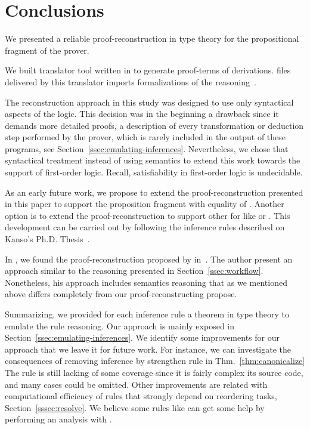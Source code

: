 \documentclass[../main.tex]{subfiles}
\begin{document}

\section{Conclusions}
\label{sec:conclusions}

We presented a reliable proof-reconstruction in type theory
for the propositional fragment of the \Metis prover.

We built \Athena translator tool written in \Haskell
to generate \Agda proof-terms of \Metis derivations.
\Agda files delivered by this translator imports
\Agda formalizations of the \Metis reasoning~\cite{AgdaProp,AgdaMetis}.

The reconstruction approach in this study was designed to use
only syntactical aspects of the logic.
This decision was in the beginning a drawback
since it demands more detailed proofs, a
description of every transformation or deduction step performed by
the prover, which is rarely included in the output of these programs,
see Section~\ref{ssec:emulating-inferences}.
Nevertheless, we chose that syntactical treatment instead of using
semantics to extend this work towards the support of first-order logic.
Recall, satisfiability in first-order logic is undecidable.

As an early future work, we propose to extend the
proof-reconstruction presented in this paper to support the
proposition fragment with equality of \Metis.
Another option is to extend the proof-reconstruction to support other \ATPs for \CPL like  or .
This development can be carried out by following the 
inference rules described on Kanso's Ph.D. Thesis~\cite{Kanso2012}.

In \Agda, we found the proof-reconstruction proposed by \citeauthor{Kanso2012}
in~\cite{Kanso2012,kanso2016light}. The author present an approach similar to
the reasoning presented in Section~\ref{ssec:workflow}.
Nonetheless, his approach includes semantics reasoning that as we mentioned
above differs completely from our proof-reconstructing propose.

Summarizing, we provided for each \Metis inference rule a theorem in
type theory to emulate the rule reasoning. Our approach is mainly
exposed in Section~\ref{ssec:emulating-inferences}.
We identify some improvements for our approach that we leave it for future
work.
For instance, we can investigate the consequences of removing \clausify
inference by strengthen \canonicalize rule in Thm.~\ref{thm:canonicalize}
The \simplify rule is still lacking of some coverage since it is fairly
complex its \Metis source code, and many cases could be omitted.
Other improvements are related with computational efficiency of
rules that strongly depend on reordering tasks,
Section~\ref{sssec:resolve}.
We believe some rules like \canonicalize can get some help by
performing an analysis with \Athena.
\end{document}
